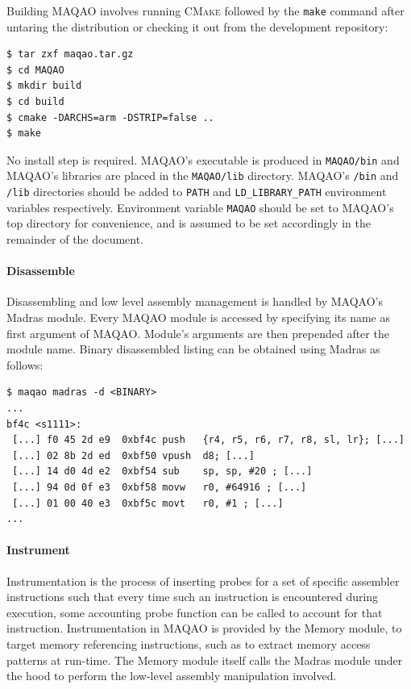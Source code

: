 \documentclass[11pt, a4paper, twoside]{montblanc2}
\def\cmake{\textsc{CMake}\xspace}
\begin{document}
Building MAQAO involves running \cmake followed by the \verb|make| command after untaring the 
distribution or checking it out from the development repository:

\begin{verbatim}
$ tar zxf maqao.tar.gz
$ cd MAQAO
$ mkdir build
$ cd build
$ cmake -DARCHS=arm -DSTRIP=false ..
$ make
\end{verbatim}

No install step is required. MAQAO's executable is produced in \verb|MAQAO/bin| and MAQAO's 
libraries are placed in the \verb|MAQAO/lib| directory. MAQAO's \verb|/bin| and \verb|/lib|
directories should be added to \verb|PATH| and \verb|LD_LIBRARY_PATH| environment variables 
respectively. Environment variable \verb|MAQAO| should be set to MAQAO's top directory for 
convenience, and is assumed to be set accordingly in the remainder of the document.

\paragraph{Disassemble}

Disassembling and low level assembly management is handled by MAQAO's Madras module. Every MAQAO 
module is accessed by specifying its name as first argument of MAQAO. Module's arguments are then 
prepended after the module name. Binary disassembled listing can be obtained using Madras as 
follows:

\begin{verbatim}
$ maqao madras -d <BINARY>
...
bf4c <s1111>:
 [...] f0 45 2d e9  0xbf4c push   {r4, r5, r6, r7, r8, sl, lr}; [...]
 [...] 02 8b 2d ed  0xbf50 vpush  d8; [...]
 [...] 14 d0 4d e2  0xbf54 sub    sp, sp, #20 ; [...]
 [...] 94 0d 0f e3  0xbf58 movw   r0, #64916 ; [...]
 [...] 01 00 40 e3  0xbf5c movt   r0, #1 ; [...]
...
\end{verbatim}

\paragraph{Instrument}

Instrumentation is the process of inserting probes for a set of specific
assembler instructions such that every time such an instruction is encountered
during execution, some accounting probe function can be called to account for
that instruction. Instrumentation in MAQAO is provided by the Memory module,
to target memory referencing instructions, such as to extract memory access
patterns at run-time. The Memory module itself calls the Madras module under the
hood to perform the low-level assembly manipulation involved.
\end{document}
